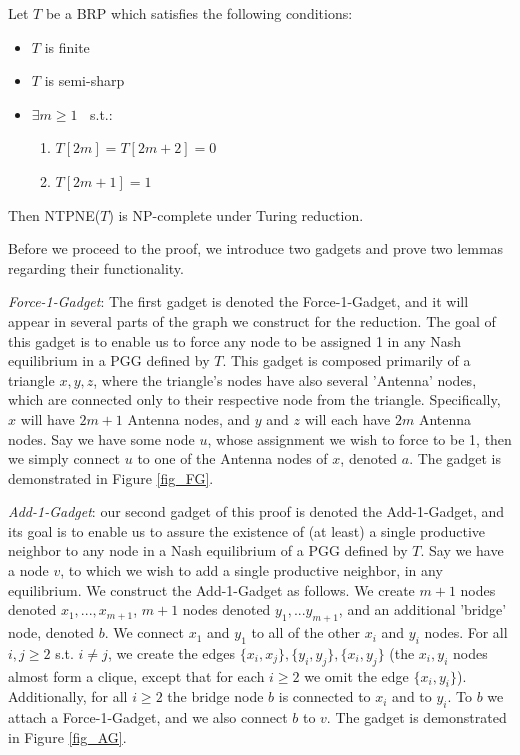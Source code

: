 \documentclass[runningheads]{llncs}
\begin{document}
\begin{theorem}
\label{thrm_semi_sharp_isolated_odd}
Let $T$ be a BRP which satisfies the following conditions:
\begin{itemize}
\item $T$ is finite
\item $T$ is semi-sharp
\item $\exists m\geq 1 \;\;$ s.t.:
    \begin{enumerate}
        \item $T[2m]=T[2m+2]=0$
        \item  $T[2m+1]=1$
    \end{enumerate}
\end{itemize}
Then NTPNE($T$) is NP-complete under Turing reduction.
\end{theorem}

Before we proceed to the proof, we introduce two gadgets and prove two lemmas regarding their functionality.

\textit{Force-1-Gadget}: The first gadget is denoted the Force-1-Gadget, and it will appear in several parts of the graph we construct for the reduction. The goal of this gadget is to enable us to force any node to be assigned 1 in any Nash equilibrium in a PGG defined by $T$.
This gadget is composed primarily of a triangle $x,y,z$, where the triangle's nodes have also several 'Antenna' nodes, which are connected only to their respective node from the triangle. Specifically, $x$ will have $2m+1$ Antenna nodes, and $y$ and $z$ will each have $2m$ Antenna nodes. Say we have some node $u$, whose assignment we wish to force to be 1, then we simply connect $u$ to one of the Antenna nodes of $x$, denoted $a$. The gadget is demonstrated in Figure \ref{fig_FG}.

\textit{Add-1-Gadget}: our second gadget of this proof is denoted the Add-1-Gadget, and its goal is to enable us to assure the existence of (at least) a single productive neighbor to any node in a Nash equilibrium of a PGG defined by $T$.
Say we have a node $v$, to which we wish to add a single productive neighbor, in any equilibrium.
We construct the Add-1-Gadget as follows. We create $m+1$ nodes denoted $x_1,...,x_{m+1}$, $m+1$ nodes denoted $y_1,...y_{m+1}$, and an additional 'bridge' node, denoted $b$. We connect $x_1$ and $y_1$ to all of the other $x_i$ and $y_i$ nodes. For all $i,j\geq 2$ s.t. $i\ne j$, we create the edges $\{x_i,x_j\},\{y_i,y_j\},\{x_i,y_j\}$ (the $x_i,y_i$ nodes almost form a clique, except that for each $i\geq 2$ we omit the edge $\{x_i,y_i\}$). Additionally, for all $i\geq 2$ the bridge node $b$ is connected to $x_i$ and to $y_i$.
To $b$ we attach a Force-1-Gadget, and we also connect $b$ to $v$. The gadget is demonstrated in Figure \ref{fig_AG}.
\end{document}
